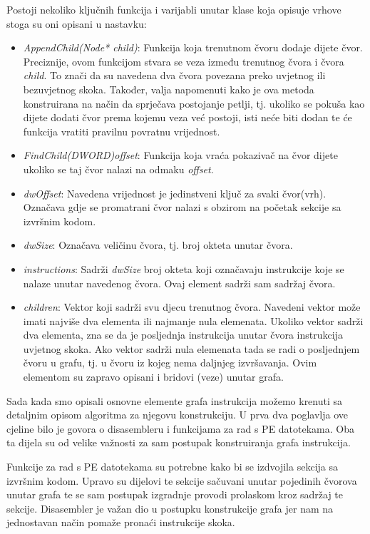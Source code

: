 \documentclass[times, utf8, diplomski, numeric]{fer}
\begin{document}
Postoji nekoliko ključnih funkcija i varijabli unutar klase koja opisuje vrhove
stoga su oni opisani u nastavku:

\begin{itemize}
\item \emph{AppendChild(Node* child)}: Funkcija koja trenutnom čvoru dodaje
dijete čvor. Preciznije, ovom funkcijom stvara se veza između trenutnog čvora i
čvora \emph{child}. To znači da su navedena dva čvora povezana preko uvjetnog
ili bezuvjetnog skoka. Također, valja napomenuti kako je ova metoda
konstruirana na način da sprječava postojanje petlji, tj. ukoliko se pokuša kao
dijete dodati čvor prema kojemu veza već postoji, isti neće biti dodan te će
funkcija vratiti pravilnu povratnu vrijednost.
\item \emph{FindChild(DWORD)offset}: Funkcija koja vraća pokazivač na čvor			%
dijete ukoliko se taj čvor nalazi na odmaku \emph{offset}.
\item \emph{dwOffset}: Navedena vrijednost je jedinstveni ključ za svaki
čvor(vrh). Označava gdje se promatrani čvor nalazi s obzirom na početak sekcije
sa izvršnim kodom.
\item \emph{dwSize}: Označava veličinu čvora, tj. broj okteta unutar čvora.
\item \emph{instructions}: Sadrži \emph{dwSize} broj okteta koji označavaju instrukcije koje se nalaze unutar navedenog čvora. Ovaj element sadrži sam sadržaj čvora.
\item \emph{children}: Vektor koji sadrži svu djecu trenutnog čvora. Navedeni
vektor može imati najviše dva elementa ili najmanje nula elemenata. Ukoliko
vektor sadrži dva elementa, zna se da je posljednja instrukcija unutar čvora
instrukcija uvjetnog skoka. Ako vektor sadrži nula elemenata tada se radi o
posljednjem čvoru u grafu, tj. u čvoru iz kojeg nema daljnjeg izvršavanja. Ovim
elementom su zapravo opisani i bridovi (veze) unutar grafa.
\end{itemize}

Sada kada smo opisali osnovne elemente grafa instrukcija možemo krenuti sa
detaljnim opisom algoritma za njegovu konstrukciju. U prva dva poglavlja ove
cjeline bilo je govora o disasembleru i funkcijama za rad s PE datotekama. Oba
ta dijela su od velike važnosti za sam postupak konstruiranja grafa
instrukcija.

Funkcije za rad s PE datotekama su potrebne kako bi se izdvojila sekcija sa
izvršnim kodom. Upravo su dijelovi te sekcije sačuvani unutar pojedinih čvorova
unutar grafa te se sam postupak izgradnje provodi prolaskom kroz sadržaj te
sekcije. Disasembler je važan dio u postupku konstrukcije grafa jer nam na
jednostavan način pomaže pronaći instrukcije skoka.
\end{document}
